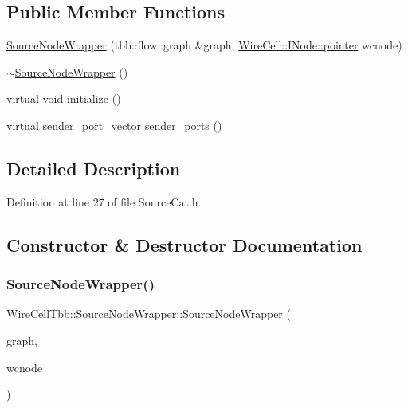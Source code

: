\subsection*{Public Member Functions}
\begin{DoxyCompactItemize}
\item 
\hyperlink{class_wire_cell_tbb_1_1_source_node_wrapper_add22d816e8d28eb895ca96439c159062}{Source\+Node\+Wrapper} (tbb\+::flow\+::graph \&graph, \hyperlink{class_wire_cell_1_1_interface_a09c548fb8266cfa39afb2e74a4615c37}{Wire\+Cell\+::\+I\+Node\+::pointer} wcnode)
\item 
\hyperlink{class_wire_cell_tbb_1_1_source_node_wrapper_af5dcbf039c087116d4215a41c8b3a2d3}{$\sim$\+Source\+Node\+Wrapper} ()
\item 
virtual void \hyperlink{class_wire_cell_tbb_1_1_source_node_wrapper_a59e1229e8eca5c2510d95e405cce9f42}{initialize} ()
\item 
virtual \hyperlink{namespace_wire_cell_tbb_a99272fef0f0c33dc9d4e6e8f777b2e6e}{sender\+\_\+port\+\_\+vector} \hyperlink{class_wire_cell_tbb_1_1_source_node_wrapper_acd2f3593b008c9570593412192b99b33}{sender\+\_\+ports} ()
\end{DoxyCompactItemize}


\subsection{Detailed Description}


Definition at line 27 of file Source\+Cat.\+h.



\subsection{Constructor \& Destructor Documentation}
\mbox{\label{class_wire_cell_tbb_1_1_source_node_wrapper_add22d816e8d28eb895ca96439c159062}} 
\subsubsection{\texorpdfstring{Source\+Node\+Wrapper()}{SourceNodeWrapper()}}
{\footnotesize\ttfamily Wire\+Cell\+Tbb\+::\+Source\+Node\+Wrapper\+::\+Source\+Node\+Wrapper (\begin{DoxyParamCaption}\item[{tbb\+::flow\+::graph \&}]{graph,  }\item[{\hyperlink{class_wire_cell_1_1_interface_a09c548fb8266cfa39afb2e74a4615c37}{Wire\+Cell\+::\+I\+Node\+::pointer}}]{wcnode }\end{DoxyParamCaption})\hspace{0.3cm}{\ttfamily [inline]}}



